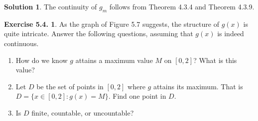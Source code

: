 \documentclass[12pt]{article}
\theoremstyle{definition}
\theoremstyle{exercise}
\newtheorem{exercise}{Exercise 5.4.}
\theoremstyle{solution}
\newtheorem*{solution}{Solution}
\begin{document}
\begin{solution}
    The continuity of \( g_m \) follows from Theorem 4.3.4 and Theorem 4.3.9.
\end{solution}

\begin{exercise}
\label{ex:4}
    As the graph of Figure 5.7 suggests, the structure of \( g(x) \) is quite intricate. Answer the following questions, assuming that \( g(x) \) is indeed continuous.
    \begin{enumerate}
        \item How do we know \( g \) attains a maximum value \( M \) on \( [0, 2] \)? What is this value?

        \item Let \( D \) be the set of points in \( [0, 2] \) where \( g \) attains its maximum. That is \( D = \{ x \in [0, 2] : g(x) = M \} \). Find one point in \( D \).

        \item Is \( D \) finite, countable, or uncountable?
    \end{enumerate}
\end{exercise}
\end{document}
